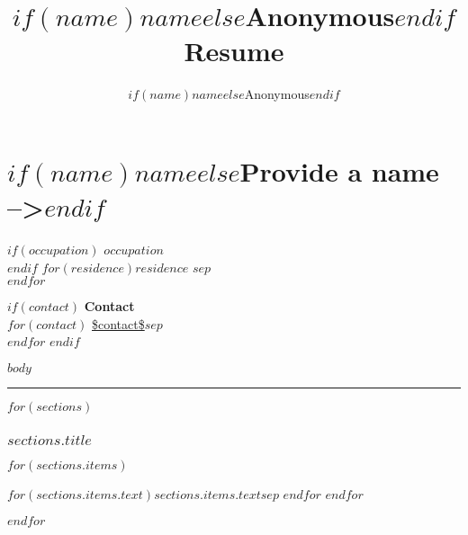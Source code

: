 \documentclass[11pt,a4paper]{scrartcl}
\author{$if(name)$$name$$else$Anonymous$endif$}
\title{$if(name)$$name$$else$Anonymous$endif$ Resume}
\begin{document}
\color{TxtColor}

\part*{$if(name)$$name$$else$Provide a name -->$endif$}

\begin{minipage}[t]{0.48\textwidth}
$if(occupation)$
\textbf{$occupation$} \\
$endif$
$for(residence)$$residence$ $sep$ \\$endfor$
\end{minipage}%
\begin{minipage}[t]{0.48\textwidth}
\begin{flushright}
$if(contact)$
  \textbf{Contact} \\
    $for(contact)$
    \url{$contact$}$sep$ \\
    $endfor$
$endif$
\end{flushright}
\end{minipage}

$body$

{\color{AccentColor}\rule{\linewidth}{0.5mm}}

$for(sections)$
\section*{$sections.title$}
\begin{description}

$for(sections.items)$
\item [$if(sections.items.label)$$sections.items.label$$endif$] $for(sections.items.text)$$sections.items.text$$sep$ \newline $endfor$
$endfor$

\end{description}
$endfor$
\end{document}
